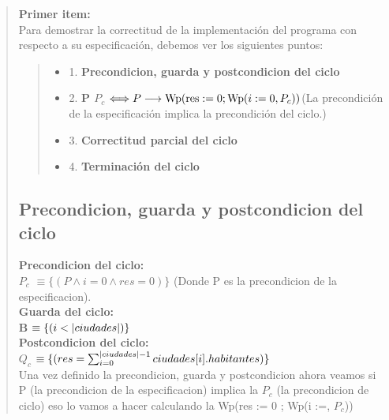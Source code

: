 \documentclass[10pt,a4paper]{article}
\begin{document}
\begin{quote}
 \textbf{Primer item:} 
 \\
 Para demostrar la correctitud de la implementación del programa con respecto a su especificación, debemos ver los siguientes puntos:
 \begin{quote}
 \begin{itemize}
 	\item 1. \textbf{Precondicion, guarda y postcondicion del ciclo}
 	\item 2. \textbf{P \implica $P_c$} $\Longleftrightarrow P \longrightarrow \text{Wp}(\text{res} := 0; \text{Wp}(i := 0, P_c))$(La precondición de la especificación implica la precondición del ciclo.)
 	\item 3. \textbf{Correctitud parcial del ciclo} 
 	\item 4. \textbf{Terminación del ciclo} 
 \end{itemize}
 \end{quote}
 \subsection{Precondicion, guarda y postcondicion del ciclo}
 \textbf{Precondicion del ciclo:} \\ 
 \vspace{0.2cm}
 \textbf{$P_c$} $\equiv \{(P \land i = 0 \land res = 0)\}$ (Donde P es la precondicion de la especificacion).\\
 \vspace{0.2cm}
 \textbf{Guarda del ciclo:}\\ 
 \vspace{0.2cm}
 \textbf{B} $\equiv \{(i < |ciudades|)\}$ \\
 \vspace*{0.2cm}
 \textbf{Postcondicion del ciclo:} \\
 \vspace{0.2cm}
 \textbf{$Q_c$} $\equiv \{(res = \sum_{i=0}^{|ciudades|-1}ciudades[i].habitantes)\} $ \\ 
 \vspace{0.2cm}
 Una vez definido la precondicion, guarda y postcondicion ahora veamos si P (la precondicion de la especificacion) implica la $P_c$ (la precondicion de ciclo) eso lo vamos a hacer calculando la Wp(res := 0 ; Wp(i :=, $P_c$))

\end{quote}
\end{document}
